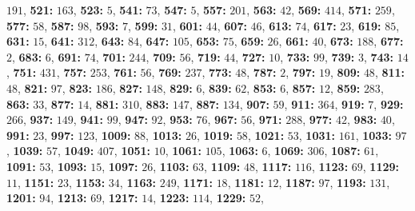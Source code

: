 $191$, \textsf{\bfseries 521:} $163$, \textsf{\bfseries 523:} $5$, \textsf{\bfseries 541:} $73$, \textsf{\bfseries 547:} $5$, 
\textsf{\bfseries 557:} $201$, \textsf{\bfseries 563:} $42$, \textsf{\bfseries 569:} $414$, \textsf{\bfseries 571:} $259$, \textsf{\bfseries 577:} $58$, \textsf{\bfseries 587:} $98$, \textsf{\bfseries 593:} $7$, \textsf{\bfseries 599:} $31$, \textsf{\bfseries 601:} $44$, \textsf{\bfseries 607:} $46$, \textsf{\bfseries 613:} $74$, \textsf{\bfseries 617:} $23$, \textsf{\bfseries 619:} $85$, \textsf{\bfseries 631:} $15$, \textsf{\bfseries 641:} $312$, \textsf{\bfseries 643:} $84$, \textsf{\bfseries 647:} $105$, \textsf{\bfseries 653:} $75$, \textsf{\bfseries 659:} $26$, \textsf{\bfseries 661:} $40$, \textsf{\bfseries 673:} $188$, \textsf{\bfseries 677:} $2$, \textsf{\bfseries 683:} $6$, \textsf{\bfseries 691:} $74$, \textsf{\bfseries 701:} $244$, \textsf{\bfseries 709:} $56$, \textsf{\bfseries 719:} $44$, \textsf{\bfseries 727:} $10$, \textsf{\bfseries 733:} $99$, \textsf{\bfseries 739:} $3$, \textsf{\bfseries 743:} $14$, \textsf{\bfseries 751:} $431$, \textsf{\bfseries 757:} $253$, \textsf{\bfseries 761:} $56$, \textsf{\bfseries 769:} $237$, \textsf{\bfseries 773:} $48$, \textsf{\bfseries 787:} $2$, \textsf{\bfseries 797:} $19$, \textsf{\bfseries 809:} $48$, \textsf{\bfseries 811:} $48$, \textsf{\bfseries 821:} $97$, \textsf{\bfseries 823:} $186$, \textsf{\bfseries 827:} $148$, \textsf{\bfseries 829:} $6$, \textsf{\bfseries 839:} $62$, \textsf{\bfseries 853:} $6$, \textsf{\bfseries 857:} $12$, \textsf{\bfseries 859:} $283$, \textsf{\bfseries 863:} $33$, \textsf{\bfseries 877:} $14$, \textsf{\bfseries 881:} $310$, \textsf{\bfseries 883:} $147$, \textsf{\bfseries 887:} $134$, \textsf{\bfseries 907:} $59$, \textsf{\bfseries 911:} $364$, \textsf{\bfseries 919:} $7$, \textsf{\bfseries 929:} $266$, \textsf{\bfseries 937:} $149$, \textsf{\bfseries 941:} $99$, \textsf{\bfseries 947:} $92$, \textsf{\bfseries 953:} $76$, \textsf{\bfseries 967:} $56$, \textsf{\bfseries 971:} $288$, \textsf{\bfseries 977:} $42$, \textsf{\bfseries 983:} $40$, \textsf{\bfseries 991:} $23$, \textsf{\bfseries 997:} $123$, \textsf{\bfseries 1009:} $88$, \textsf{\bfseries 1013:} $26$, \textsf{\bfseries 1019:} $58$, \textsf{\bfseries 1021:} $53$, \textsf{\bfseries 1031:} $161$, \textsf{\bfseries 1033:} $97$, \textsf{\bfseries 1039:} $57$, \textsf{\bfseries 1049:} $407$, \textsf{\bfseries 1051:} $10$, \textsf{\bfseries 1061:} $105$, \textsf{\bfseries 1063:} $6$, \textsf{\bfseries 1069:} $306$, \textsf{\bfseries 1087:} $61$, \textsf{\bfseries 1091:} $53$, \textsf{\bfseries 1093:} $15$, \textsf{\bfseries 1097:} $26$, \textsf{\bfseries 1103:} $63$, \textsf{\bfseries 1109:} $48$, \textsf{\bfseries 1117:} $116$, \textsf{\bfseries 1123:} $69$, \textsf{\bfseries 1129:} $11$, \textsf{\bfseries 1151:} $23$, \textsf{\bfseries 1153:} $34$, \textsf{\bfseries 1163:} $249$, \textsf{\bfseries 1171:} $18$, \textsf{\bfseries 1181:} $12$, \textsf{\bfseries 1187:} $97$, \textsf{\bfseries 1193:} $131$, \textsf{\bfseries 1201:} $94$, \textsf{\bfseries 1213:} $69$, \textsf{\bfseries 1217:} $14$, \textsf{\bfseries 1223:} $114$, \textsf{\bfseries 1229:} $52$, 
